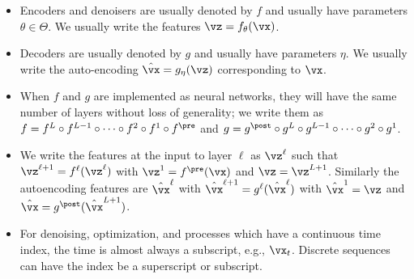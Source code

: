\begin{itemize}
    \item Encoders and denoisers are usually denoted by \(f\) and
        usually have parameters \(\theta \in \Theta\). We usually
        write the features \(\vz = f_{\theta}(\vx)\).
    \item Decoders are usually denoted by \(g\) and usually have
        parameters \(\eta\). We usually write the auto-encoding
        \(\hat{\vx} = g_{\eta}(\vz)\) corresponding to \(\vx\).
    \item When \(f\) and \(g\) are implemented as neural networks,
        they will have the same number of layers without loss of
        generality; we write them as \(f = f^{L} \circ f^{L - 1}
        \circ \cdots \circ f^{2} \circ f^{1} \circ f^{\pre}\) and \(g
            = g^{\post} \circ g^{L} \circ g^{ L - 1} \circ \cdots \circ
        g^{2} \circ g^{1}\).
    \item We write the features at the input to layer \(\ell\) as
        \(\vz^{\ell}\) such that \(\vz^{\ell + 1} =
        f^{\ell}(\vz^{\ell})\) with \(\vz^{1} = f^{\pre}(\vx)\) and
        \(\vz = \vz^{L + 1}\). Similarly the autoencoding features
        are \(\hat{\vx}^{\ell}\) with \(\hat{\vx}^{\ell + 1} =
        g^{\ell}(\hat{\vx}^{\ell})\) with \(\hat{\vx}^{1} = \vz\) and
        \(\hat{\vx} = g^{\post}(\hat{\vx}^{L + 1})\).
    \item For denoising, optimization, and processes which have a
        continuous time index, the time is almost always a subscript,
        e.g., \(\vx_{t}\). Discrete sequences can have the index be a
        superscript or subscript.
\end{itemize}

